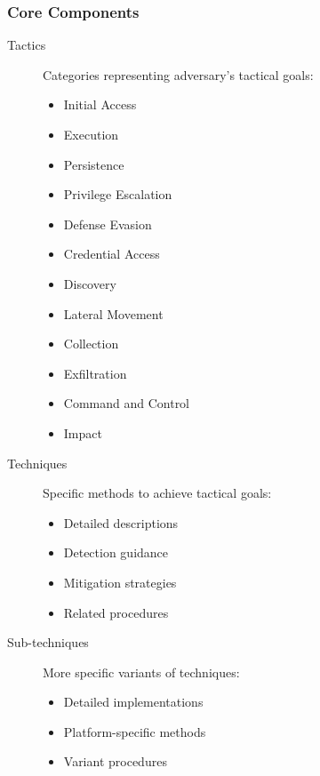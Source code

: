 \subsubsection{Core Components}
\begin{description}
    \item[Tactics] Categories representing adversary's tactical goals:
    \begin{itemize}
        \item Initial Access
        \item Execution
        \item Persistence
        \item Privilege Escalation
        \item Defense Evasion
        \item Credential Access
        \item Discovery
        \item Lateral Movement
        \item Collection
        \item Exfiltration
        \item Command and Control
        \item Impact
    \end{itemize}
    
    \item[Techniques] Specific methods to achieve tactical goals:
    \begin{itemize}
        \item Detailed descriptions
        \item Detection guidance
        \item Mitigation strategies
        \item Related procedures
    \end{itemize}
    
    \item[Sub-techniques] More specific variants of techniques:
    \begin{itemize}
        \item Detailed implementations
        \item Platform-specific methods
        \item Variant procedures
    \end{itemize}
\end{description}

